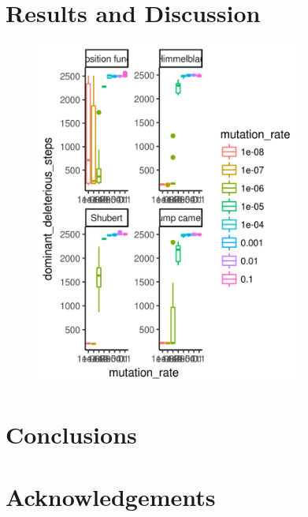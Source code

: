 \documentclass[letterpaper]{article}
\begin{document}
\section{Results and Discussion}
\begin{figure}
\includegraphics[width=3.5in]{figs/dom_deleterious_mutation_rate.png}
\end{figure}



\section{Conclusions}

\section{Acknowledgements}


\footnotesize



\end{document}
